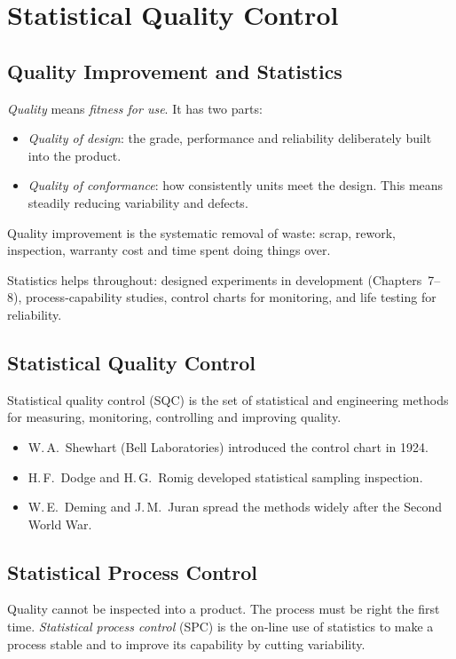 \chapter{Statistical Quality Control}

\section{Quality Improvement and Statistics}

\emph{Quality} means \emph{fitness for use}. It has two parts:
\begin{itemize}
  \item \emph{Quality of design}: the grade, performance and reliability deliberately built into the product.
  \item \emph{Quality of conformance}: how consistently units meet the design. This means steadily reducing variability and defects.
\end{itemize}
Quality improvement is the systematic removal of waste: scrap, rework, inspection, warranty cost and time spent doing things over.

Statistics helps throughout: designed experiments in development (Chapters~7--8), process-capability studies, control charts for monitoring, and life testing for reliability.

\section{Statistical Quality Control}

Statistical quality control (SQC) is the set of statistical and engineering methods for measuring, monitoring, controlling and improving quality.
\begin{itemize}
  \item W.\,A.\ Shewhart (Bell Laboratories) introduced the control chart in 1924.
  \item H.\,F.\ Dodge and H.\,G.\ Romig developed statistical sampling inspection.
  \item W.\,E.\ Deming and J.\,M.\ Juran spread the methods widely after the Second World War.
\end{itemize}

\section{Statistical Process Control}

Quality cannot be inspected into a product. The process must be right the first time. \emph{Statistical process control} (SPC) is the on-line use of statistics to make a process stable and to improve its capability by cutting variability.

